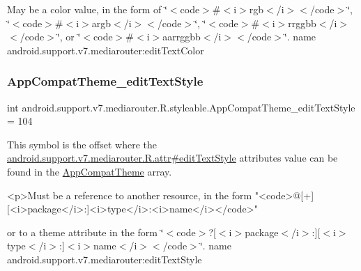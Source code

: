 May be a color value, in the form of \char`\"{}$<$code$>$\#$<$i$>$rgb$<$/i$>$$<$/code$>$\char`\"{}, \char`\"{}$<$code$>$\#$<$i$>$argb$<$/i$>$$<$/code$>$\char`\"{}, \char`\"{}$<$code$>$\#$<$i$>$rrggbb$<$/i$>$$<$/code$>$\char`\"{}, or \char`\"{}$<$code$>$\#$<$i$>$aarrggbb$<$/i$>$$<$/code$>$\char`\"{}.  name android.\+support.\+v7.\+mediarouter\+:edit\+Text\+Color \mbox{\label{classandroid_1_1support_1_1v7_1_1mediarouter_1_1R_1_1styleable_a397e422b63e3ca3295e55fd0a548cd24}} 
\subsubsection{\texorpdfstring{App\+Compat\+Theme\+\_\+edit\+Text\+Style}{AppCompatTheme\_editTextStyle}}
{\footnotesize\ttfamily int android.\+support.\+v7.\+mediarouter.\+R.\+styleable.\+App\+Compat\+Theme\+\_\+edit\+Text\+Style = 104\hspace{0.3cm}{\ttfamily [static]}}

This symbol is the offset where the \hyperlink{classandroid_1_1support_1_1v7_1_1mediarouter_1_1R_1_1attr_a0c95d2cc5d88bdc8040dd1c8bf764a38}{android.\+support.\+v7.\+mediarouter.\+R.\+attr\#edit\+Text\+Style} attribute\textquotesingle{}s value can be found in the \hyperlink{classandroid_1_1support_1_1v7_1_1mediarouter_1_1R_1_1styleable_a4e3d3900c75d49aeb2f283cac00214d6}{App\+Compat\+Theme} array.

\begin{DoxyVerb}      <p>Must be a reference to another resource, in the form "<code>@[+][<i>package</i>:]<i>type</i>:<i>name</i></code>"
\end{DoxyVerb}
 or to a theme attribute in the form \char`\"{}$<$code$>$?\mbox{[}$<$i$>$package$<$/i$>$\+:\mbox{]}\mbox{[}$<$i$>$type$<$/i$>$\+:\mbox{]}$<$i$>$name$<$/i$>$$<$/code$>$\char`\"{}.  name android.\+support.\+v7.\+mediarouter\+:edit\+Text\+Style \mbox{\label{classandroid_1_1support_1_1v7_1_1mediarouter_1_1R_1_1styleable_a1ce96df8d4a5f00bdb41453b81f64749}} 
